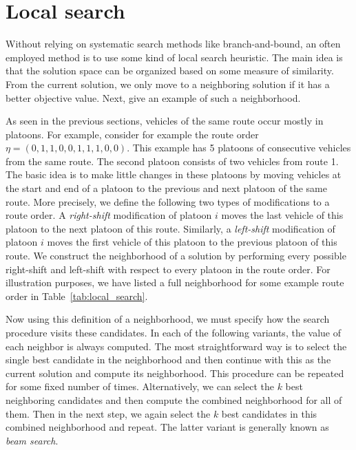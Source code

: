 \documentclass[a4paper]{report}
\theoremstyle{definition}
\theoremstyle{plain}
\begin{document}
\chapter{Local search}\label{sec:local_search}

Without relying on systematic search methods like branch-and-bound, an often
employed method is to use some kind of local search heuristic.
%
The main idea is that the solution space can be organized based on some measure
of similarity. From the current solution, we only move to a neighboring solution
if it has a better objective value.
%
Next, give an example of such a neighborhood.

As seen in the previous sections, vehicles of the same route occur mostly in
platoons. For example, consider for example the route order
$\eta = (0, 1, 1, 0, 0, 1, 1, 1, 0, 0)$. This example has 5 platoons of
consecutive vehicles from the same route. The second platoon consists of two
vehicles from route 1.
The basic idea is to make little changes in these platoons by moving vehicles at
the start and end of a platoon to the previous and next platoon of the same
route.
%
More precisely, we define the following two types of modifications to a route
order. A \textit{right-shift} modification of platoon $i$ moves the last vehicle of this
platoon to the next platoon of this route. Similarly, a \textit{left-shift} modification
of platoon $i$ moves the first vehicle of this platoon to the previous platoon
of this route.
%
We construct the neighborhood of a solution by performing every possible
right-shift and left-shift with respect to every platoon in the route order. For
illustration purposes, we have listed a full neighborhood for some example route
order in Table~\ref{tab:local_search}.

Now using this definition of a neighborhood, we must specify how the search
procedure visits these candidates.
In each of the following variants, the value of each neighbor is always computed.
%
The most straightforward way is to select the single best candidate in the
neighborhood and then continue with this as the current solution and compute its
neighborhood. This procedure can be repeated for some fixed number of times.
Alternatively, we can select the $k$ best neighboring candidates and then
compute the combined neighborhood for all of them. Then in the next step, we
again select the $k$ best candidates in this combined neighborhood and repeat.
The latter variant is generally known as \textit{beam search}.
\end{document}
